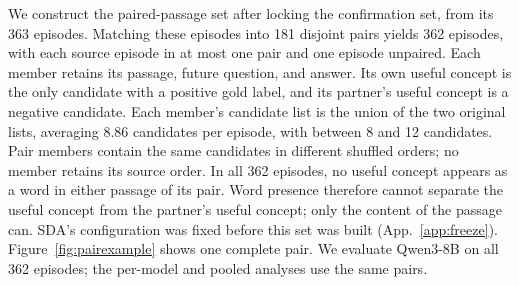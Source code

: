 \FloatBarrier
We construct the paired-passage set after locking the confirmation set,
from its 363 episodes. Matching these episodes into 181 disjoint pairs
yields 362 episodes, with each source episode in at most one pair and
one episode unpaired. Each member retains its passage, future question,
and answer. Its own useful concept is the only candidate with a
positive gold label, and its partner's useful concept is a negative
candidate. Each member's candidate list is the union of the two
original lists, averaging 8.86 candidates per episode, with between
8 and 12 candidates. Pair members contain the same candidates in
different shuffled orders; no member retains its source order.
In all 362 episodes, no useful concept appears as a word in either
passage of its pair. Word presence therefore cannot separate the
useful concept from the partner's useful concept; only the content of
the passage can. SDA's configuration was fixed before this set was
built (App.~\ref{app:freeze}).
Figure~\ref{fig:pairexample} shows one complete pair.
We evaluate Qwen3-8B on all 362 episodes; the per-model and pooled
analyses use the same pairs.

